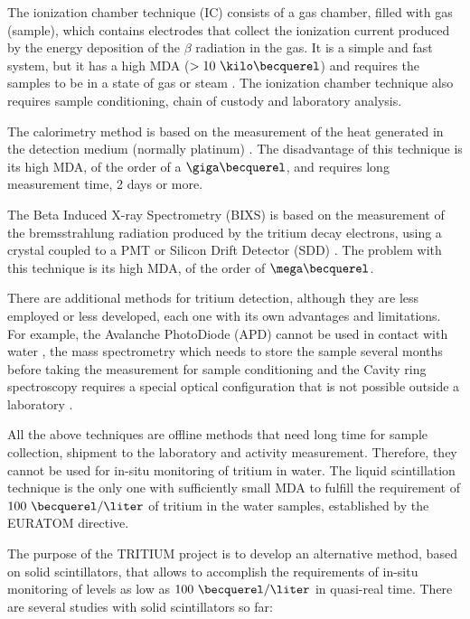 The ionization chamber technique (IC) consists of a gas chamber, filled with gas (sample), which contains electrodes that collect the ionization current produced by the energy deposition of the $\beta$ radiation in the gas. It is a simple and fast system, but it has a high MDA ($> 10~\kilo\becquerel$) and requires the samples to be in a state of gas or steam \cite{IonizationChamber1, IonizationChamber2}. The ionization chamber technique also requires sample conditioning, chain of custody and laboratory analysis. 

The calorimetry method is based on the measurement of the heat generated in the detection medium (normally platinum) \cite{Calorimeter1, Calorimeter2}. The disadvantage of this technique is its high MDA, of the order of a $\giga\becquerel$, and requires long measurement time, 2 days or more.

The Beta Induced X-ray Spectrometry (BIXS) is based on the measurement of the bremsstrahlung radiation produced by the tritium decay electrons, using a  crystal coupled to a PMT  \cite{XRays1, XRays2} or Silicon Drift Detector (SDD) \cite{Bremstrahlung}. The problem with this technique is its high MDA, of the order of $\mega\becquerel$.

There are additional methods for tritium detection, although they are less employed or less developed, each one with its own advantages and limitations. For example, the Avalanche PhotoDiode (APD) cannot be used in contact with water \cite{APD},  the mass spectrometry which needs to store the sample several months before taking the measurement for sample conditioning \cite{Spectrometry} and the Cavity ring spectroscopy requires a special optical configuration that is not possible outside a laboratory \cite{Ring}.

All the above techniques are offline methods that need long time for sample collection, shipment to the laboratory and activity measurement. Therefore, they cannot be used for in-situ monitoring of tritium in water. The liquid scintillation technique is the only one with sufficiently small MDA to fulfill the requirement of $100~\becquerel/\liter$ of tritium in the water samples, established by the EURATOM directive. 

The purpose of the TRITIUM project is to develop an alternative method, based on solid scintillators, that allows to accomplish the requirements of in-situ monitoring of levels as low as $100~\becquerel/\liter$ in quasi-real time. There are several studies with solid scintillators so far:

